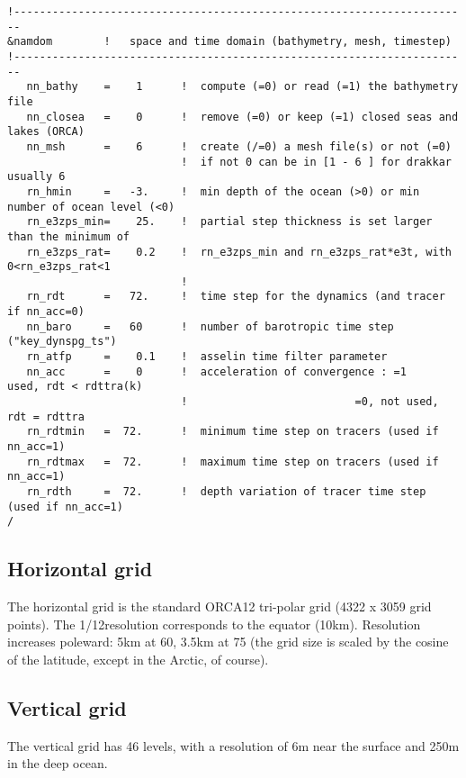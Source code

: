 \scriptsize
\begin{verbatim}
!-----------------------------------------------------------------------
&namdom        !   space and time domain (bathymetry, mesh, timestep)
!-----------------------------------------------------------------------
   nn_bathy    =    1      !  compute (=0) or read (=1) the bathymetry file
   nn_closea   =    0      !  remove (=0) or keep (=1) closed seas and lakes (ORCA)
   nn_msh      =    6      !  create (/=0) a mesh file(s) or not (=0)
                           !  if not 0 can be in [1 - 6 ] for drakkar usually 6
   rn_hmin     =   -3.     !  min depth of the ocean (>0) or min number of ocean level (<0)
   rn_e3zps_min=    25.    !  partial step thickness is set larger than the minimum of
   rn_e3zps_rat=    0.2    !  rn_e3zps_min and rn_e3zps_rat*e3t, with 0<rn_e3zps_rat<1
                           !
   rn_rdt      =   72.     !  time step for the dynamics (and tracer if nn_acc=0)
   nn_baro     =   60      !  number of barotropic time step            ("key_dynspg_ts")
   rn_atfp     =    0.1    !  asselin time filter parameter
   nn_acc      =    0      !  acceleration of convergence : =1      used, rdt < rdttra(k)
                           !                          =0, not used, rdt = rdttra
   rn_rdtmin   =  72.      !  minimum time step on tracers (used if nn_acc=1)
   rn_rdtmax   =  72.      !  maximum time step on tracers (used if nn_acc=1)
   rn_rdth     =  72.      !  depth variation of tracer time step  (used if nn_acc=1)
/
\end{verbatim}

\normalsize

\subsection{Horizontal grid}

The horizontal grid is the standard ORCA12 tri-polar grid (4322 x 3059 grid points). 
The 1/12\degres \enspace resolution corresponds to the equator (10km). 
Resolution increases poleward: 5km at 60\degres, 3.5km at 75\degres \enspace 
(the grid size is scaled by the cosine of the latitude, except in the Arctic, of course).

\subsection{Vertical grid}

The vertical grid has 46 levels, with a resolution of 6m near the surface and 250m in the deep ocean.

